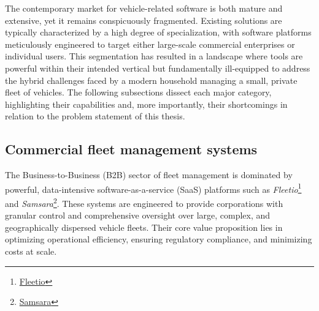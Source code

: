 The contemporary market for vehicle-related software is both mature and extensive, yet it remains conspicuously fragmented. Existing solutions are typically characterized by a high degree of specialization, with software platforms meticulously engineered to target either large-scale commercial enterprises or individual users. This segmentation has resulted in a landscape where tools are powerful within their intended vertical but fundamentally ill-equipped to address the hybrid challenges faced by a modern household managing a small, private fleet of vehicles. The following subsections dissect each major category, highlighting their capabilities and, more importantly, their shortcomings in relation to the problem statement of this thesis.

\subsection{Commercial fleet management systems}
The Business-to-Business (B2B) sector of fleet management is dominated by powerful, data-intensive software-as-a-service (SaaS) platforms such as \textit{Fleetio}\footnote{\href{https://www.fleetio.com/}{Fleetio}} and \textit{Samsara}\footnote{\href{https://www.samsara.com/}{Samsara}}. These systems are engineered to provide corporations with granular control and comprehensive oversight over large, complex, and geographically dispersed vehicle fleets. Their core value proposition lies in optimizing operational efficiency, ensuring regulatory compliance, and minimizing costs at scale.

\textgap

